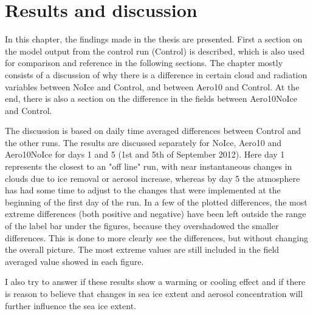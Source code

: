 \chapter{Results and discussion}
\label{chap:results}
In this chapter, the findings made in the thesis are presented. First a section on the model output from the control run (Control) is described, which is also used for comparison and reference in the following sections. The chapter mostly consists of a discussion of why there is a difference in certain cloud and radiation variables between NoIce and Control, and between Aero10 and Control. At the end, there is also a section on the difference in the fields between Aero10NoIce and Control.

The discussion is based on daily time averaged differences between Control and the other runs. The results are discussed separately for NoIce, Aero10 and Aero10NoIce for days 1 and 5 (1st and 5th of September 2012). Here day 1 represents the closest to an "off line" run, with near instantaneous changes in clouds due to ice removal or aerosol increase, whereas by day 5 the atmosphere has had some time to adjust to the changes that were implemented at the beginning of the first day of the run. In a few of the plotted differences, the most extreme differences (both positive and negative) have been left outside the range of the label bar under the figures, because they overshadowed the smaller differences. This is done to more clearly see the differences, but without changing the overall picture. The most extreme values are still included in the field averaged value showed in each figure.

I also try to answer if these results show a warming or cooling effect and if there is reason to believe that changes in sea ice extent and aerosol concentration will further influence the sea ice extent.

